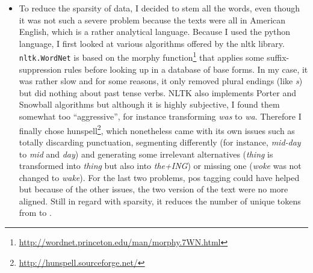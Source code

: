 \begin{itemize}
\item To reduce the sparsity of data, I decided to stem all the words, even though it was not such a severe problem because the texts were all in American English, which is a rather analytical language. Because I used the python language, I first looked at various algorithms offered by the \gls{nltk} library\autocite{bird2009nltk}. \texttt{nltk.WordNet} is based on the morphy function\footnote{\href{http://wordnet.princeton.edu/man/morphy.7WN.html}{http://wordnet.princeton.edu/man/morphy.7WN.html}} that applies some suffix-suppression rules before looking up in a database of base forms. In my case, it was rather slow and for some reasons, it only removed plural endings (like \emph{s}) but did nothing about past tense verbs. NLTK also implements Porter\autocite{porter1980algo} and Snowball\autocite{porter2001snowball} algorithms but although it is highly subjective, I found them somewhat too \enquote{aggressive}, for instance transforming \emph{was} to \emph{wa}. Therefore I finally chose hunspell\footnote{\href{http://hunspell.sourceforge.net/}{http://hunspell.sourceforge.net/}}, which nonetheless came with its own issues such as totally discarding punctuation, segmenting differently (for instance, \emph{mid-day} to \emph{mid} and \emph{day}) and generating some irrelevant alternatives (\emph{thing} is transformed into \emph{thing} but also into \emph{the+ING}) or missing one (\emph{woke} was not changed to \emph{wake}). For the last two problems, \gls{pos} tagging could have helped but because of the other issues, the two version of the text were no more aligned. Still in regard with sparsity, it reduces the number of unique tokens from  to .


\end{itemize}
